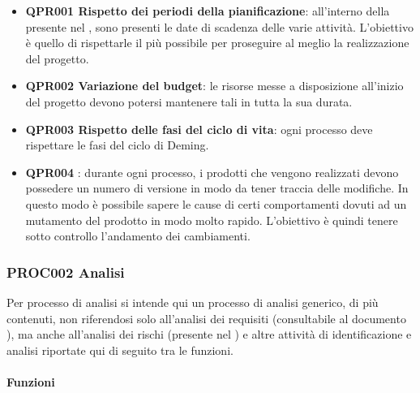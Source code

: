		\begin{itemize} 
			\item \textbf{QPR001 Rispetto dei periodi della pianificazione}: all'interno della presente nel \PdPd, sono presenti le date di scadenza delle varie attività. L'obiettivo è quello di rispettarle il più possibile per proseguire al meglio la realizzazione del progetto.
			\item \textbf{QPR002 Variazione del budget}: le risorse messe a disposizione all'inizio del progetto devono potersi mantenere tali in tutta la sua durata.
			\item \textbf{QPR003 Rispetto delle fasi del ciclo di vita}: ogni processo deve rispettare le fasi del ciclo di Deming.
			\item \textbf{QPR004 }: durante ogni processo, i prodotti che vengono realizzati devono possedere un numero di versione in modo da tener traccia delle modifiche. In questo modo è possibile sapere le cause di certi comportamenti dovuti ad un mutamento del prodotto in modo molto rapido. L'obiettivo è quindi tenere sotto controllo l'andamento dei cambiamenti.
		\end{itemize}
	
	\subsubsection{PROC002 Analisi}
	Per processo di analisi si intende qui un processo di analisi generico, di più contenuti, non riferendosi solo all'analisi dei requisiti (consultabile al documento \AdRd), ma anche all'analisi dei rischi (presente nel \PdPd) e altre attività di identificazione e analisi riportate qui di seguito tra le funzioni.
	
	
	
		\paragraph*{Funzioni}
		
